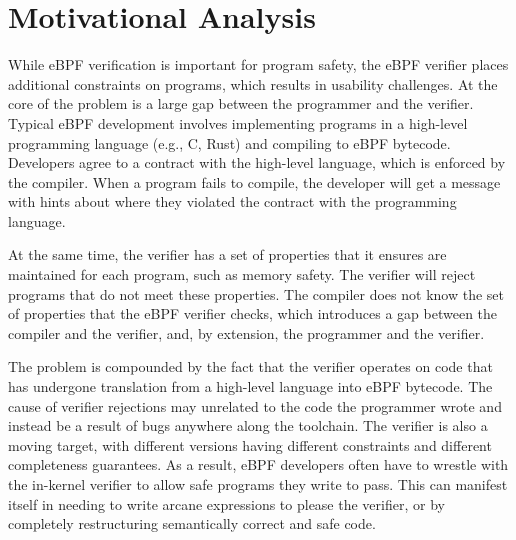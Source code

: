 \section{Motivational Analysis}
\label{sec:motivation}

While eBPF verification is important for program safety, the eBPF verifier
    places additional constraints on programs, which results in usability
    challenges.
At the core of the problem is a large gap between the programmer and the
    verifier.
Typical eBPF development involves implementing programs in a high-level
    programming language (e.g., C, Rust) and compiling to eBPF bytecode.
Developers agree to a contract with the high-level language, which is enforced by the compiler.
When a program fails to compile, the developer will get a message with hints about where they violated
    the contract with the programming language.

At the same time, the verifier has a set of properties that it ensures are maintained for each program, such as memory safety.
The verifier will reject programs that do not meet these properties.
The compiler does not know the set of properties that the eBPF verifier checks, which 
    introduces a gap between the compiler and the verifier, and, by extension, the programmer and the verifier.

The problem is compounded by the fact that the verifier operates on code that has undergone
    translation from a high-level language into eBPF bytecode.
The cause of verifier rejections may unrelated to the code the programmer wrote and instead
    be a result of bugs anywhere along the toolchain.
The verifier is also a moving target, with different versions having different constraints
    and different completeness guarantees.
As a result, eBPF developers often have to wrestle with the in-kernel verifier
    to allow safe programs they write to pass.
This can manifest itself in needing to write arcane expressions to please the
    verifier, or by completely restructuring semantically correct and safe code.



